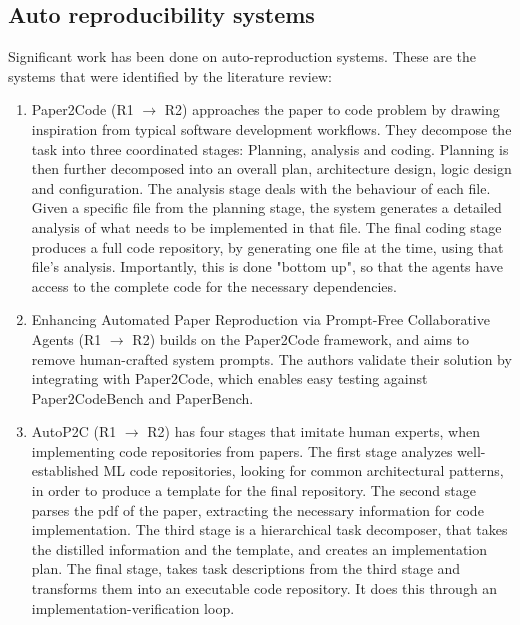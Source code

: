 \documentclass[8pt,a4paper]{article}
\begin{document}
\subsection{Auto reproducibility systems}
Significant work has been done on auto-reproduction systems. 
These are the systems that were identified by the literature review:
\begin{enumerate}
    \item Paper2Code\cite{paper2code} (R1 $\rightarrow$ R2)
        \subitem approaches the paper to code problem by drawing inspiration from typical software development workflows.
        They decompose the task into three coordinated stages: Planning, analysis and coding.
        Planning is then further decomposed into an overall plan, architecture design, logic design and configuration.
        The analysis stage deals with the behaviour of each file. Given a specific file from the planning stage, 
        the system generates a detailed analysis of what needs to be implemented in that file.
        The final coding stage produces a full code repository, by generating one file at the time, using that file's analysis.
        Importantly, this is done "bottom up", so that the agents have access to the complete code for the necessary dependencies.
    \item Enhancing Automated Paper Reproduction via Prompt-Free Collaborative Agents\cite{lin2025} (R1 $\rightarrow$ R2)
        \subitem builds on the Paper2Code framework, and aims to remove human-crafted system prompts.
            The authors validate their solution by integrating with Paper2Code\cite{paper2code}, which enables easy testing against 
            Paper2CodeBench\cite{paper2code} and PaperBench\cite{paperbench}.
    \item AutoP2C\cite{autop2c}\label{itm:autop2cdesc} (R1 $\rightarrow$ R2)
        \subitem has four stages that imitate human experts, when implementing code repositories from papers.
        The first stage analyzes well-established ML code repositories, looking for common architectural patterns, 
        in order to produce a template for the final repository.
        The second stage parses the pdf of the paper, extracting the necessary information for code implementation.
        The third stage is a hierarchical task decomposer, that takes the distilled information and the template, and creates an implementation plan.
        The final stage, takes task descriptions from the third stage and transforms them into an executable code repository. 
        It does this through an implementation-verification loop.

\end{enumerate}
\end{document}
